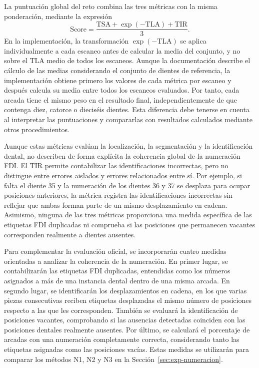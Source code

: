 La puntuación global del reto combina las tres métricas con la misma ponderación, mediante la expresión
\[
\mathrm{Score} = 
\frac{\mathrm{TSA}+\exp(-\mathrm{TLA})+\mathrm{TIR}}{3}.
\]
En la implementación, la transformación $\exp(-\mathrm{TLA})$ se aplica individualmente a cada escaneo antes de calcular la media del conjunto, y no sobre el TLA medio de todos los escaneos. Aunque la documentación describe el cálculo de las medias considerando el conjunto de dientes de referencia, la implementación obtiene primero los valores de cada métrica por escaneo y después calcula su media entre todos los escaneos evaluados. Por tanto, cada arcada tiene el mismo peso en el resultado final, independientemente de que contenga diez, catorce o dieciséis dientes. Esta diferencia debe tenerse en cuenta al interpretar las puntuaciones y compararlas con resultados calculados mediante otros procedimientos.

Aunque estas métricas evalúan la localización, la segmentación y la identificación dental, no describen de forma explícita la coherencia global de la numeración FDI. El TIR permite contabilizar las identificaciones incorrectas, pero no distingue entre errores aislados y errores relacionados entre sí. Por ejemplo, si falta el diente 35 y la numeración de los dientes 36 y 37 se desplaza para ocupar posiciones anteriores, la métrica registra las identificaciones incorrectas sin reflejar que ambas forman parte de un mismo desplazamiento en cadena. Asimismo, ninguna de las tres métricas proporciona una medida específica de las etiquetas FDI duplicadas ni comprueba si las posiciones que permanecen vacantes corresponden realmente a dientes ausentes.

Para complementar la evaluación oficial, se incorporarán cuatro medidas orientadas a analizar la coherencia de la numeración. En primer lugar, se contabilizarán las etiquetas FDI duplicadas, entendidas como los números asignados a más de una instancia dental dentro de una misma arcada. En segundo lugar, se identificarán los desplazamientos en cadena, en los que varias piezas consecutivas reciben etiquetas desplazadas el mismo número de posiciones respecto a las que les corresponden. También se evaluará la identificación de posiciones vacantes, comprobando si las ausencias detectadas coinciden con las posiciones dentales realmente ausentes. Por último, se calculará el porcentaje de arcadas con una numeración completamente correcta, considerando tanto las etiquetas asignadas como las posiciones vacías. Estas medidas se utilizarán para comparar los métodos N1, N2 y N3 en la Sección~\ref{sec:exp-numeracion}.